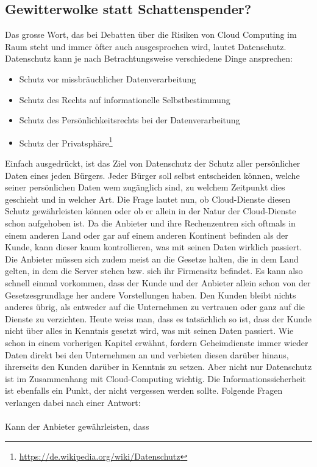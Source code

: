 \subsection{Gewitterwolke statt Schattenspender?}
Das grosse Wort, das bei Debatten über die Risiken von Cloud Computing im Raum steht und immer öfter auch ausgesprochen wird, lautet Datenschutz. Datenschutz kann je nach Betrachtungsweise verschiedene Dinge ansprechen:

\begin{itemize}
\item Schutz vor missbräuchlicher Datenverarbeitung
\item Schutz des Rechts auf informationelle Selbstbestimmung
\item Schutz des Persönlichkeitsrechts bei der Datenverarbeitung
\item Schutz der Privatsphäre\footnote{\url{https://de.wikipedia.org/wiki/Datenschutz}}
\end{itemize}

Einfach ausgedrückt, ist das Ziel von Datenschutz der Schutz aller persönlicher Daten eines jeden Bürgers. Jeder Bürger soll selbst entscheiden können, welche seiner persönlichen Daten wem zugänglich sind, zu welchem Zeitpunkt dies geschieht und in welcher Art. Die Frage lautet nun, ob Cloud-Dienste diesen Schutz gewährleisten können oder ob er allein in der Natur der Cloud-Dienste schon aufgehoben ist. Da die Anbieter und ihre Rechenzentren sich oftmals in einem anderen Land oder gar auf einem anderen Kontinent befinden als der Kunde, kann dieser kaum kontrollieren, was mit seinen Daten wirklich passiert. Die Anbieter müssen sich zudem meist an die Gesetze halten, die in dem Land gelten, in dem die Server stehen bzw. sich ihr Firmensitz befindet. Es kann also schnell einmal vorkommen, dass der Kunde und der Anbieter allein schon von der Gesetzesgrundlage her andere Vorstellungen haben. Den Kunden bleibt nichts anderes übrig, als entweder auf die Unternehmen zu vertrauen oder ganz auf die Dienste zu verzichten. Heute weiss man, dass es tatsächlich so ist, dass der Kunde nicht über alles in Kenntnis gesetzt wird, was mit seinen Daten passiert. Wie schon in einem vorherigen Kapitel erwähnt, fordern Geheimdienste immer wieder Daten direkt bei den Unternehmen an und verbieten diesen darüber hinaus, ihrerseits den Kunden darüber in Kenntnis zu setzen.
Aber nicht nur Datenschutz ist im Zusammenhang mit Cloud-Computing wichtig. Die Informationssicherheit ist ebenfalls ein Punkt, der nicht vergessen werden sollte. Folgende Fragen verlangen dabei nach einer Antwort:
\\
\\
Kann der Anbieter gewährleisten, dass

